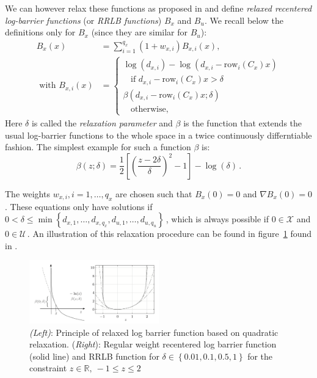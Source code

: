\documentclass[conference]{IEEEtran}
\theoremstyle{definition}
\theoremstyle{remark}
\def\cal#1{\mathcal{#1}}
\def\rm#1{\mathrm{#1}}
\newcommand{\R}{\mathbb{R}}
\begin{document}
We can however relax these functions as proposed in \cite{RRLB-linear-MPC} and define \textit{relaxed recentered log-barrier functions} (or \textit{RRLB functions}) $B_x$ and $B_u$.
We recall below the definitions only for $B_x$ (since they are similar for $B_u$):
\begin{align}
	B_x(x)&=\sum_{i=1}^{q_x}(1+w_{x,i})B_{x,i}(x),\\
	\text{ with }B_{x,i}(x)&=\begin{cases}
		\log(d_{x,i})-\log(d_{x,i}-\rm{row}_i(C_x)x)\\
		~~~~\text{if }d_{x,i}-\rm{row}_i(C_x)x>\delta\\
		\beta(d_{x,i}-\rm{row}_i(C_x)x;\delta)\\
		~~~~\text{otherwise},
	\end{cases}
\end{align}
Here $\delta$ is called the \textit{relaxation parameter} and $\beta$ is the function that extends the usual log-barrier functions to the whole space in a twice continuously differntiable fashion.
The simplest example for such a function $\beta$ is:
\begin{equation}
	\label{eq:beta}
	\beta(z;\delta)=\frac{1}{2}\left[ \left( \frac{z-2\delta}{\delta} \right)^2-1 \right]-\log(\delta)\,.
\end{equation}

The weights $w_{x,i}, i=1,\dots,q_x$ are chosen such that $B_x(0)=0$ and $\nabla B_x(0)=0$.
These equations only have solutions if $0<\delta\leq\min\left\{d_{x,1},\ldots,d_{x,q_x},d_{u,1},\ldots,d_{u,q_u}\right\}$\,, which is always possible if $0\in\cal{X}$ and $0\in\cal{U}$\,.
An illustration of this relaxation procedure can be found in figure~\ref{fig:RRLB-functions} found in \cite{RRLB-linear-MPC}.

\begin{figure}
	\centering
	\includegraphics[width=0.5\textwidth]{images/rrlb-functions.png}
	\caption{\textit{(Left)}: Principle of relaxed log barrier function based on quadratic relaxation. (\textit{Right}): Regular weight recentered log barrier function (solid line) and RRLB function for $\delta\in\left\{ 0.01,0.1,0.5,1 \right\}$ for the constraint $z\in\R,~-1\leq z\leq 2$}
	\label{fig:RRLB-functions}
\end{figure}
\end{document}
